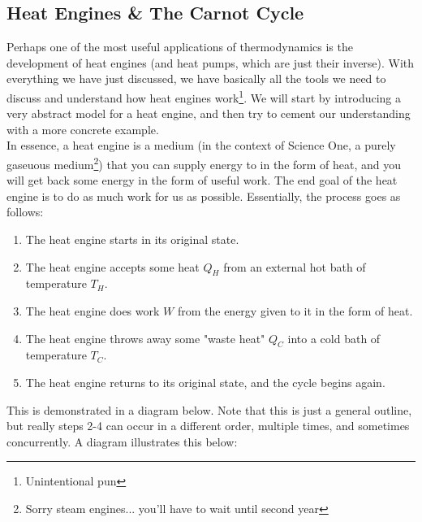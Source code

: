 \subsection{Heat Engines \& The Carnot Cycle}
Perhaps one of the most useful applications of thermodynamics is the development of heat engines (and heat pumps, which are just their inverse). With everything we have just discussed, we have basically all the tools we need to discuss and understand how heat engines work\footnote{Unintentional pun}. We will start by introducing a very abstract model for a heat engine, and then try to cement our understanding with a more concrete example. \\

In essence, a heat engine is a medium (in the context of Science One, a purely gaseuous medium\footnote{Sorry steam engines... you'll have to wait until second year}) that you can supply energy to in the form of heat, and you will get back some energy in the form of useful work. The end goal of the heat engine is to do as much work for us as possible. Essentially, the process goes as follows:
\begin{enumerate}
    \item The heat engine starts in its original state.
    \item The heat engine accepts some heat $Q_H$ from an external hot bath of temperature $T_H$.
    \item The heat engine does work $W$ from the energy given to it in the form of heat.
    \item The heat engine throws away some "waste heat" $Q_C$ into a cold bath of temperature $T_C$.
    \item The heat engine returns to its original state, and the cycle begins again.
\end{enumerate}
This is demonstrated in a diagram below. Note that this is just a general outline, but really steps 2-4 can occur in a different order, multiple times, and sometimes concurrently. A diagram illustrates this below:
\begin{center}
\end{center}
